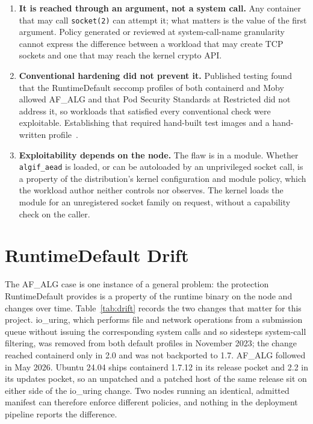 \begin{enumerate}[leftmargin=*]
\item \textbf{It is reached through an argument, not a system call.} Any container that may call \texttt{socket(2)} can attempt it; what matters is the value of the first argument. Policy generated or reviewed at system-call-name granularity cannot express the difference between a workload that may create TCP sockets and one that may reach the kernel crypto API.
\item \textbf{Conventional hardening did not prevent it.} Published testing found that the RuntimeDefault seccomp profiles of both containerd and Moby allowed AF\_ALG and that Pod Security Standards at Restricted did not address it, so workloads that satisfied every conventional check were exploitable. Establishing that required hand-built test images and a hand-written profile~\cite{juliet}.
\item \textbf{Exploitability depends on the node.} The flaw is in a module. Whether \texttt{algif\_aead} is loaded, or can be autoloaded by an unprivileged socket call, is a property of the distribution's kernel configuration and module policy, which the workload author neither controls nor observes. The kernel loads the module for an unregistered socket family on request, without a capability check on the caller.
\end{enumerate}

\section{RuntimeDefault Drift}

The AF\_ALG case is one instance of a general problem: the protection RuntimeDefault provides is a property of the runtime binary on the node and changes over time. Table~\ref{tab:drift} records the two changes that matter for this project. io\_uring, which performs file and network operations from a submission queue without issuing the corresponding system calls and so sidesteps system-call filtering, was removed from both default profiles in November 2023; the change reached containerd only in 2.0 and was not backported to 1.7. AF\_ALG followed in May 2026. Ubuntu 24.04 ships containerd 1.7.12 in its release pocket and 2.2 in its updates pocket, so an unpatched and a patched host of the same release sit on either side of the io\_uring change. Two nodes running an identical, admitted manifest can therefore enforce different policies, and nothing in the deployment pipeline reports the difference.

